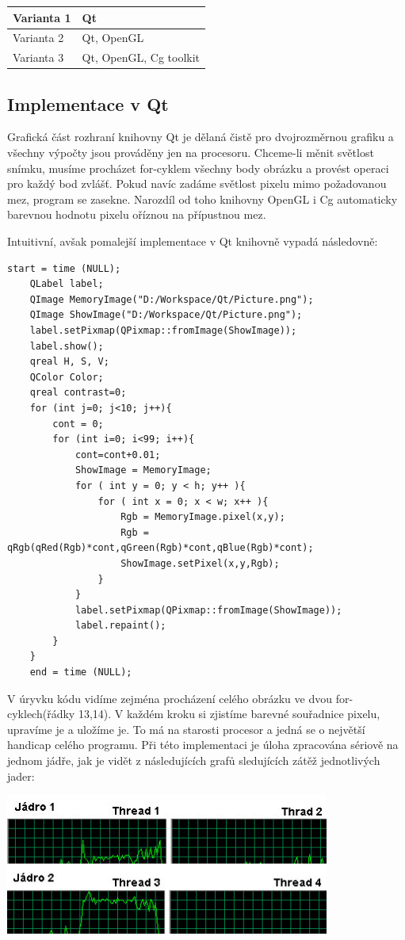 \begin{tabular}{| l | l | }
  \hline                       
  Varianta 1 & Qt\\
  \hline
  Varianta 2 & Qt, OpenGL\\
  \hline
  Varianta 3 & Qt, OpenGL, Cg toolkit \\
  \hline  
\end{tabular}

\subsection{Implementace v Qt}
Grafická část rozhraní knihovny Qt je dělaná čistě pro dvojrozměrnou grafiku a všechny výpočty jsou prováděny jen na procesoru. Chceme-li měnit světlost snímku, musíme procházet for-cyklem všechny body obrázku a provést operaci pro každý bod zvlášť. Pokud navíc zadáme světlost pixelu mimo požadovanou mez, program se zasekne. Narozdíl od toho knihovny OpenGL i Cg automaticky barevnou hodnotu pixelu oříznou na přípustnou mez.

Intuitivní, avšak pomalejší implementace v Qt knihovně vypadá následovně:

\begin{lstlisting}[label=DicomImageClass,caption={...}]
	start = time (NULL);
	QLabel label;
	QImage MemoryImage("D:/Workspace/Qt/Picture.png");
	QImage ShowImage("D:/Workspace/Qt/Picture.png");
	label.setPixmap(QPixmap::fromImage(ShowImage));
	label.show();
	qreal H, S, V;
	QColor Color;
	qreal contrast=0;
	for (int j=0; j<10; j++){
		cont = 0;
		for (int i=0; i<99; i++){
			cont=cont+0.01;
			ShowImage = MemoryImage;
			for ( int y = 0; y < h; y++ ){
				for ( int x = 0; x < w; x++ ){
					Rgb = MemoryImage.pixel(x,y);
					Rgb = qRgb(qRed(Rgb)*cont,qGreen(Rgb)*cont,qBlue(Rgb)*cont);
					ShowImage.setPixel(x,y,Rgb);
				}
			}
			label.setPixmap(QPixmap::fromImage(ShowImage));
			label.repaint();
		}
	}
	end = time (NULL);
\end{lstlisting}

V úryvku kódu vidíme zejména procházení celého obrázku ve dvou for-cyklech(řádky 13,14). V každém kroku si zjistíme barevné souřadnice pixelu, upravíme je a uložíme je. To má na starosti procesor a jedná se o největší handicap celého programu. Při této implementaci je úloha zpracována sériově na jednom jádře, jak je vidět z následujících grafů sledujících zátěž jednotlivých jader:

\hspace{1cm}\includegraphics[width=0.8\textwidth]{Text/IMG/MultiThread.jpg}

